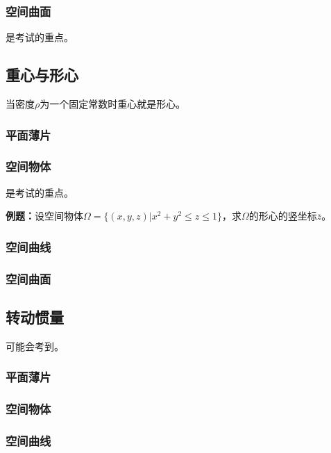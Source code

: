 \documentclass[UTF8, 12pt]{ctexart}
\begin{document}
\subsubsection{空间曲面}

是考试的重点。

\subsection{重心与形心}

当密度$\rho$为一个固定常数时重心就是形心。

\subsubsection{平面薄片}

\subsubsection{空间物体}

是考试的重点。

\textbf{例题：}设空间物体$\Omega=\{(x,y,z)|x^2+y^2\leqslant z\leqslant1\}$，求$\Omega$的形心的竖坐标$\overline{z}$。


\subsubsection{空间曲线}

\subsubsection{空间曲面}

\subsection{转动惯量}

可能会考到。

\subsubsection{平面薄片}

\subsubsection{空间物体}

\subsubsection{空间曲线}
\end{document}
